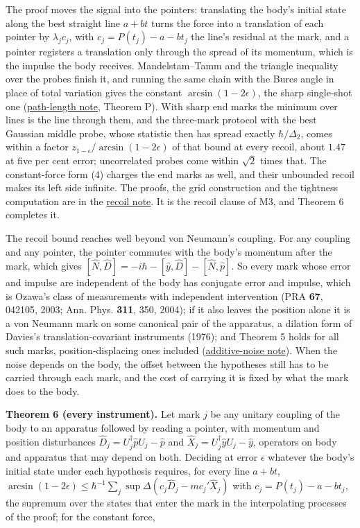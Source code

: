 \documentclass[11pt,a4paper]{article}
\begin{document}
The proof moves the signal into the pointers: translating the body's
initial state along the best straight line \(a+bt\) turns the force into
a translation of each pointer by \(\lambda_jc_j\), with
\(c_j=P(t_j)-a-bt_j\) the line's residual at the mark, and a pointer
registers a translation only through the spread of its momentum, which
is the impulse the body receives. Mandelstam--Tamm and the triangle
inequality over the probes finish it, and running the same chain with
the Bures angle in place of total variation gives the constant
\(\arcsin(1-2\epsilon)\), the sharp single-shot one
(\href{record-distance-path-length.md}{path-length note}, Theorem P).
With sharp end marks the minimum over lines is the line through them,
and the three-mark protocol with the best Gaussian middle probe, whose
statistic then has spread exactly \(\hbar/\Delta_2\), comes within a
factor \(z_{1-\epsilon}/\arcsin(1-2\epsilon)\) of that bound at every
recoil, about \(1.47\) at five per cent error; uncorrelated probes come
within \(\sqrt2\) times that. The constant-force form (4) charges the
end marks as well, and their unbounded recoil makes its left side
infinite. The proofs, the grid construction and the tightness
computation are in the
\href{record-distance-path-length.md\#recoil-only-bound-for-arbitrary-probe-states}{recoil
note}. It is the recoil clause of M3, and Theorem 6 completes it.

The recoil bound reaches well beyond von Neumann's coupling. For any
coupling and any pointer, the pointer commutes with the body's momentum
after the mark, which gives
\([\hat N,\hat D]=-i\hbar-[\hat y,\hat D]-[\hat N,\hat p]\). So every
mark whose error and impulse are independent of the body has conjugate
error and impulse, which is Ozawa's class of measurements with
independent intervention (PRA \textbf{67}, 042105, 2003; Ann. Phys.
\textbf{311}, 350, 2004); if it also leaves the position alone it is a
von Neumann mark on some canonical pair of the apparatus, a dilation
form of Davies's translation-covariant instruments (1976); and Theorem 5
holds for all such marks, position-displacing ones included
(\href{mark-cost-and-statistical-floor.md\#quantum-probe-cost-and-body-independent-noise}{additive-noise
note}). When the noise depends on the body, the offset between the
hypotheses still has to be carried through each mark, and the cost of
carrying it is fixed by what the mark does to the body.

\textbf{Theorem 6 (every instrument).} Let mark \(j\) be any unitary
coupling of the body to an apparatus followed by reading a pointer, with
momentum and position disturbances
\(\hat D_j=U_j^\dagger\hat pU_j-\hat p\) and
\(\hat X_j=U_j^\dagger\hat yU_j-\hat y\), operators on body and
apparatus that may depend on both. Deciding at error \(\epsilon\)
whatever the body's initial state under each hypothesis requires, for
every line \(a+bt\),
\(\arcsin(1-2\epsilon)\le\hbar^{-1}\sum_j\sup\Delta(c_j\hat D_j-mc_j'\hat X_j)\)
with \(c_j=P(t_j)-a-bt_j\), the supremum over the states that enter the
mark in the interpolating processes of the proof; for the constant
force,
\end{document}

